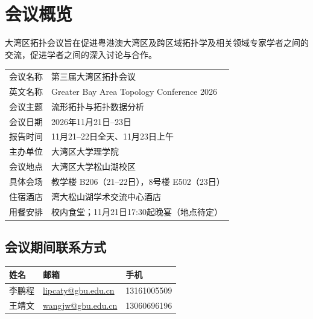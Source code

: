 \documentclass[12pt,a4paper,twoside,UTF8,fontset=none]{ctexart}
\begin{document}
\section{会议概览}

大湾区拓扑会议旨在促进粤港澳大湾区及跨区域拓扑学及相关领域专家学者之间的交流，促进学者之间的深入讨论与合作。

\vspace{0.8em}
\renewcommand{\arraystretch}{1.45}
\noindent
\begin{tabularx}{\textwidth}{B{3.2cm}Y}
  \toprule
  会议名称 & 第三届大湾区拓扑会议\\
  英文名称 & Greater Bay Area Topology Conference 2026\\
  会议主题 & 流形拓扑与拓扑数据分析\\
  会议日期 & 2026年11月21日--23日\\
  报告时间 & 11月21--22日全天、11月23日上午\\
  主办单位 & 大湾区大学理学院\\
  会议地点 & 大湾区大学松山湖校区\\
  具体会场 & 教学楼 B206（21--22日），8号楼 E502（23日） \\
  住宿酒店 & 湾大松山湖学术交流中心酒店\\
  用餐安排 & 校内食堂；11月21日17:30起晚宴（地点待定）\\
  \bottomrule
\end{tabularx}

\vspace{1.2em}
\noindent
{}

\vspace{1.0em}
\subsection*{会议期间联系方式}
\small
\renewcommand{\arraystretch}{1.45}
\noindent
\begin{tabularx}{\textwidth}{B{2.6cm}Y L{3.6cm}}
  \toprule
  姓名 & \textbf{邮箱} & \textbf{手机}\\
  \midrule
  李鹏程 & \href{mailto:lipcaty@gbu.edu.cn}{lipcaty@gbu.edu.cn} & \mbox{13161005509}\\
  王靖文 & \href{mailto:wangjw@gbu.edu.cn}{wangjw@gbu.edu.cn} & \mbox{13060696196}\\
  \bottomrule
\end{tabularx}
\normalsize
\end{document}
